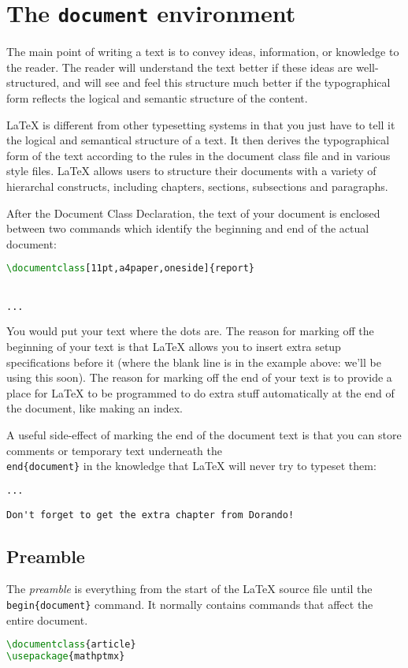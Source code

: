\section{The \texttt{document} environment}
The main point of writing a text is to convey ideas, information, or knowledge
to the reader. The reader will understand the text better if these ideas are
well-structured, and will see and feel this structure much better if the
typographical form reflects the logical and semantic structure of the content.

LaTeX is different from other typesetting systems in that you just have to tell
it the logical and semantical structure of a text. It then derives the
typographical form of the text according to the rules in the document class
file and in various style files. LaTeX allows users to structure their
documents with a variety of hierarchal constructs, including chapters,
sections, subsections and paragraphs. 

After the Document Class Declaration, the text of your document is enclosed
between two commands which identify the beginning and end of the actual
document:
\begin{lstlisting}[language={TeX}, breaklines=true,xleftmargin=15pt]
\documentclass[11pt,a4paper,oneside]{report}


...

\end{lstlisting}


You would put your text where the dots are. The reason for marking off the
beginning of your text is that LaTeX allows you to insert extra setup
specifications before it (where the blank line is in the example above: we'll
be using this soon). The reason for marking off the end of your text is to
provide a place for LaTeX to be programmed to do extra stuff automatically at
the end of the document, like making an index.

A useful side-effect of marking the end of the document text is that you can
store comments or temporary text underneath the \texttt{\\end\{document\}} in the
knowledge that LaTeX will never try to typeset them:
\begin{lstlisting}[language={TeX}, breaklines=true,xleftmargin=15pt]
...

Don't forget to get the extra chapter from Dorando!
\end{lstlisting}

\subsection{ Preamble }
The \textit{preamble} is everything from the start of the LaTeX source file
until the \texttt{\\begin\{document\}} command. It normally contains commands
that affect the entire document.
\begin{lstlisting}[language={TeX}, breaklines=true,xleftmargin=15pt]
% simple.tex - A simple article to illustrate document structure.
\documentclass{article}
\usepackage{mathptmx}

\end{lstlisting}


